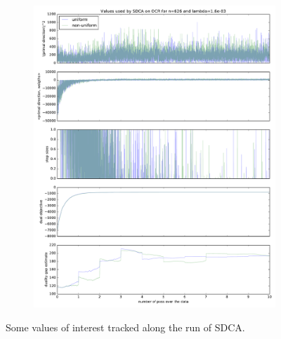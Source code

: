 \documentclass{article}
\DeclareMathOperator{\1}{\mathbb{1}}
\begin{document}
\begin{figure}[ht]
\begin{subfigure}[t]{0.3\textwidth}
        \includegraphics[width=\textwidth]{images/20170914_040717_ocr_annex}
    \end{subfigure}
    \caption{Some values of interest tracked along the run of SDCA.}
	\label{ocr annexes}
\end{figure}
\end{document}
